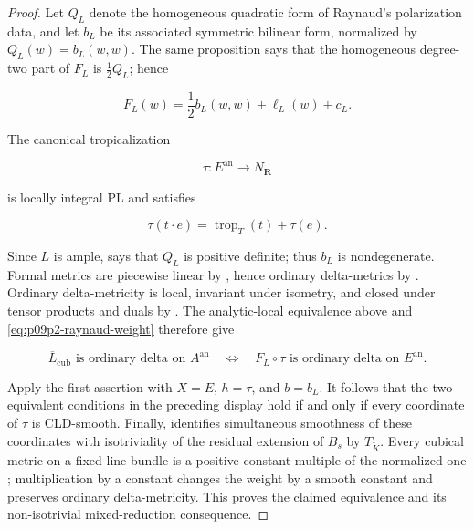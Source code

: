 \begin{proof}
Let \(Q_L\) denote the homogeneous quadratic form of Raynaud's
polarization data, and let \(b_L\) be its associated symmetric bilinear
form, normalized by \(Q_L(w)=b_L(w,w)\).  The same proposition says that
the homogeneous degree-two part of \(F_L\) is \(\frac12Q_L\); hence

\begin{equation}
\label{eq:p09p2-raynaud-quadratic}
             F_L(w)=\frac12b_L(w,w)+\ell_L(w)+c_L.
\end{equation}

The canonical tropicalization

\[
                       \tau:E^{\mathrm{an}}\longrightarrow N_{\mathbf R}
\]

is locally integral PL and satisfies

\[
              \tau(t\mathbin{\cdot}e)
                 =\operatorname{trop}_T(t)+\tau(e).
\]

Since \(L\) is ample, \cite[Theorem~B.6.4]{CLD25} says that \(Q_L\) is
positive definite; thus \(b_L\) is nondegenerate.  Formal metrics are
piecewise linear by \cite[Proposition~8.11]{GK17}, hence ordinary
delta-metrics by \cite[Remark~9.16]{GK17}.  Ordinary delta-metricity is
local, invariant under isometry, and closed under tensor products and duals
by \cite[\S9.14]{GK17}.  The analytic-local equivalence above and
\eqref{eq:p09p2-raynaud-weight} therefore give

\[
 \overline L_{\mathrm{cub}}\text{ is ordinary delta on }A^{\mathrm{an}}
 \quad\Longleftrightarrow\quad
 F_L\circ\tau\text{ is ordinary delta on }E^{\mathrm{an}}.
\]

Apply the first assertion with \(X=E\), \(h=\tau\), and \(b=b_L\).
It follows that the two equivalent conditions in the preceding display
hold if and only if every coordinate of \(\tau\) is CLD-smooth.  Finally,
\cite[Remark~19.2.3]{CLD25} identifies simultaneous smoothness of these
coordinates with isotriviality of the residual extension of \(B_s\) by
\(T_{\widetilde K}\).  Every cubical metric on a fixed line bundle
is a positive constant multiple of the normalized one
\cite[Lemma~19.1.6(b)]{CLD25}; multiplication by a constant changes the
weight by a
smooth constant and preserves ordinary delta-metricity.  This proves the
claimed equivalence and its non-isotrivial mixed-reduction consequence.
\end{proof}
